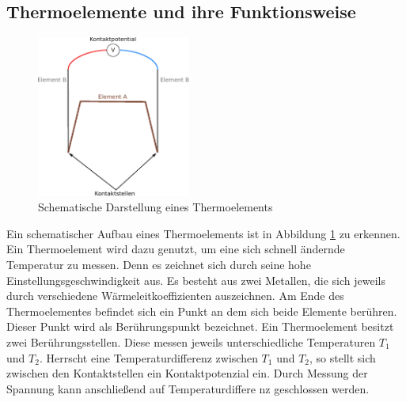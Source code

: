 \subsection{Thermoelemente und ihre Funktionsweise} %
\begin{figure}
  \centering
  \includegraphics[width=0.45\textwidth]{bilder/thermoelement.pdf}
  \caption{Schematische Darstellung eines Thermoelements}
  \label{fig:thermo}
\end{figure}
Ein schematischer Aufbau eines Thermoelements ist in Abbildung \ref{fig:thermo}
zu erkennen.
Ein Thermoelement wird dazu genutzt, um eine sich schnell ändernde 
Temperatur zu messen. 
Denn es zeichnet sich durch seine hohe Einstellungsgeschwindigkeit aus.
Es besteht aus zwei Metallen, die sich jeweils durch
verschiedene Wärmeleitkoeffizienten auszeichnen.
Am Ende des Thermoelementes befindet sich ein Punkt an dem sich
beide Elemente berühren. Dieser Punkt wird als Berührungspunkt 
bezeichnet.
Ein Thermoelement besitzt zwei Berührungsstellen.
Diese messen jeweils unterschiedliche Temperaturen $T_1$ und $T_2$.
Herrscht eine Temperaturdifferenz zwischen $T_1$ und $T_2$, so 
stellt sich zwischen den Kontaktstellen ein Kontaktpotenzial 
ein. 
Durch Messung der Spannung kann anschließend auf 
Temperaturdiffere	nz geschlossen werden.







